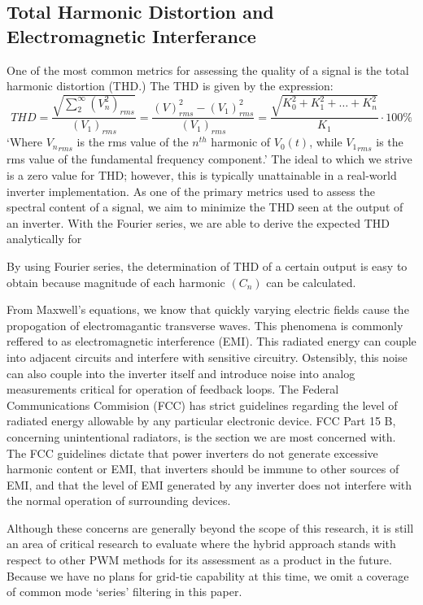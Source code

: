 \subsection{Total Harmonic Distortion and Electromagnetic Interferance}
One of the most common metrics for assessing the quality of a signal is the total harmonic distortion (THD.) The THD is given by the expression:
\begin{equation}
THD=\frac{\sqrt{\sum_{2}^{\infty}(V_n^2)_{rms}}}{(V_1)_{rms}} = \frac{(V)_{rms}^2-(V_1)^2_{rms}}{(V_1)_{rms}} = \frac{\sqrt{K_0^2+K_1^2+\ldots+K_n^2}}{K_1}\cdot100\%
\end{equation} 
`Where ${V_n}_{rms}$ is the rms value of the $n^{th}$ harmonic of $V_0(t)$, while ${V_1}_{rms}$ is the rms value of the fundamental frequency component.'\cite{fourierAnalysis} The ideal to which we strive is a zero value for THD; however, this is typically unattainable in a real-world inverter implementation. As one of the primary metrics used to assess the spectral content of a signal, we aim to minimize the THD seen at the output of an inverter. With the Fourier series, we are able to derive the expected THD analytically for

By using Fourier series, the determination of THD of a certain output is easy to obtain because magnitude of each harmonic $(C_n)$ can be calculated.

From Maxwell's equations, we know that quickly varying electric fields cause the propogation of electromagantic transverse waves. This phenomena is commonly reffered to as electromagnetic interference (EMI). This radiated energy can couple into adjacent circuits and interfere with sensitive circuitry. Ostensibly, this noise can also couple into the inverter itself and introduce noise into analog measurements critical for operation of feedback loops. The Federal Communications Commision (FCC) has strict guidelines regarding the level of radiated energy allowable by any particular electronic device. FCC Part 15 B, concerning unintentional radiators, is the section we are most concerned with.  The FCC guidelines dictate that power inverters do not generate excessive harmonic content or EMI, that inverters should be immune to other sources of EMI, and that the level of EMI generated by any inverter does not interfere with the normal operation of surrounding devices. 

Although these concerns are generally beyond the scope of this research, it is still an area of critical research to evaluate where the hybrid approach stands with respect to other PWM methods for its assessment as a product in the future. Because we have no plans for grid-tie capability at this time, we omit a coverage of common mode `series' filtering in this paper.

